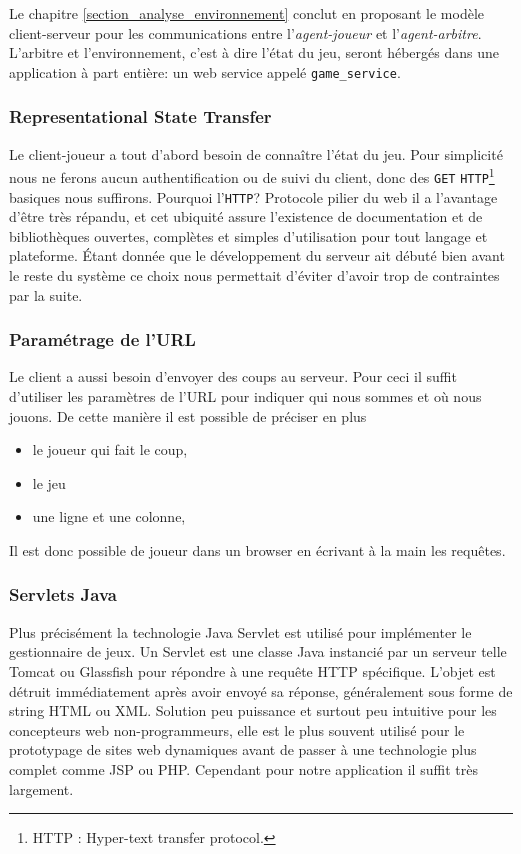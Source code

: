 Le chapitre \ref{section_analyse_environnement} conclut en proposant le modèle client-serveur pour les communications entre l'\emph{agent-joueur} et l'\emph{agent-arbitre}. L'arbitre et l'environnement, c'est à dire l'état du jeu, seront hébergés dans une application à part entière: un \og web service \fg{} appelé \texttt{game\_service}.
 
\subsubsection{\og Representational State Transfer \fg{} }

Le client-joueur a tout d'abord besoin de connaître l'état du jeu. Pour simplicité nous ne ferons aucun authentification ou de suivi du client, donc des \texttt{GET} \texttt{HTTP}\footnote{ HTTP : Hyper-text transfer protocol. } basiques nous suffirons. Pourquoi l'\texttt{HTTP}? Protocole pilier du web il a l'avantage d'être très répandu, et cet ubiquité assure l'existence de documentation et de  bibliothèques ouvertes, complètes et simples d'utilisation pour tout langage et plateforme. 
Étant donnée que le développement du serveur ait débuté bien avant le reste du système ce choix nous permettait d'éviter d'avoir trop de contraintes par la suite.

\subsubsection{ Paramétrage de l'URL }

Le client a aussi besoin d'envoyer des coups au serveur. Pour ceci il suffit d'utiliser les paramètres de l'URL pour indiquer qui nous sommes et où nous jouons. De cette manière il est possible de préciser en plus 
\begin{itemize}
\item le joueur qui fait le coup,
\item le jeu
\item une ligne et une colonne,
\end{itemize}
Il est donc possible de joueur dans un browser en écrivant à la main les requêtes.

\subsubsection{Servlets Java}
Plus précisément la technologie Java Servlet est utilisé pour implémenter le gestionnaire de jeux. Un Servlet est une classe Java instancié par un serveur telle Tomcat ou Glassfish pour répondre à une requête HTTP spécifique. L'objet est détruit immédiatement après avoir envoyé sa réponse, généralement sous forme de string HTML ou XML.
Solution peu puissance et surtout peu intuitive pour les concepteurs web non-programmeurs, elle est le plus souvent utilisé pour le prototypage de sites web dynamiques avant de passer à une technologie plus complet comme JSP ou PHP. Cependant pour notre application il suffit très largement.